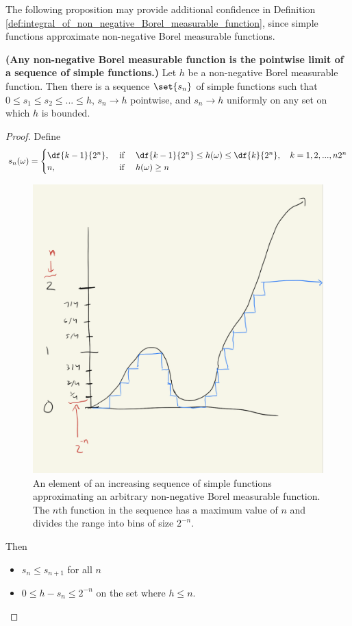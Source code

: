 \documentclass{article} %
\begin{document}

The following proposition may provide additional confidence in Definition \ref{def:integral_of_non_negative_Borel_measurable_function}, since simple functions approximate non-negative Borel measurable functions.

\begin{proposition}\textbf{(Any non-negative Borel measurable function is the pointwise limit of a sequence of simple functions.)}
Let $h$ be a non-negative Borel measurable function.  Then there is a sequence $\set{s_n}$ of simple functions such that $0 \leq s_1 \leq s_2 \leq ... \leq h$, $s_n \to h$ pointwise, and $s_n \to h$ uniformly on any set on which $h$ is bounded.	
\label{prop:there_is_a_sequence_of_simple_functions_that_increases_to_any_non_negative_borel_measurable_function}
\end{proposition}

\begin{proof}
Define 
\[ s_n(\omega) = 
\begin{cases}
\df{k-1}{2^n}, & \text{ if } \quad \df{k-1}{2^n} \leq h(\omega) \leq \df{k}{2^n},\quad k=1,2,...,n2^n \\
n, & \text{ if } \quad h(\omega) \geq n 
\end{cases}
\]	

\begin{figure}[H]
\centering
\includegraphics[width=.7\textwidth]{images/approximate_nonnegative_with_simple}	
\caption{An element of an increasing sequence of simple functions approximating an arbitrary non-negative Borel measurable function. The $n$th function in the sequence has a maximum value of $n$ and divides the range into bins of size $2^{-n}$.}
\end{figure}


Then 
\begin{itemize}
\item $s_n \leq s_{n+1}$ for all $n$
\item $0 \leq h - s_n \leq 2^{-n}$ on the set where $h \leq n$.
\end{itemize}
\end{proof}
\end{document}
